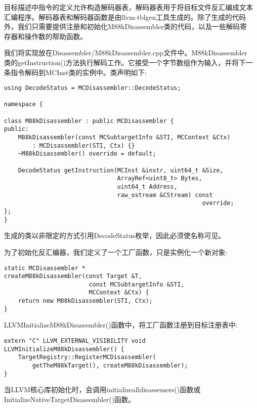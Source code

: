 目标描述中指令的定义允许构造解码器表，解码器表用于将目标文件反汇编成文本汇编程序。解码器表和解码器函数是由llvm-tblgen工具生成的。除了生成的代码外，我们只需要提供注册和初始化M88kDisassembler类的代码，以及一些解码寄存器和操作数的帮助函数。\par

我们将实现放在Disassembler/M88kDisassembler.cpp文件中。M88kDisassembler类的get\allowbreak Instruction()方法执行解码工作。它接受一个字节数组作为输入，并将下一条指令解码到MCInst类的实例中。类声明如下:\par

\begin{lstlisting}[caption={}]
using DecodeStatus = MCDisassembler::DecodeStatus;

namespace {
	
class M88kDisassembler : public MCDisassembler {
public:
	M88kDisassembler(const MCSubtargetInfo &STI, MCContext &Ctx)
		: MCDisassembler(STI, Ctx) {}
	~M88kDisassembler() override = default;
	
	DecodeStatus getInstruction(MCInst &instr, uint64_t &Size,
								ArrayRef<uint8_t> Bytes,
								uint64_t Address,
								raw_ostream &CStream) const
														override;
};
}
\end{lstlisting}

生成的类以非限定的方式引用DecodeStatus枚举，因此必须使名称可见。\par

为了初始化反汇编器，我们定义了一个工厂函数，只是实例化一个新对象:\par

\begin{lstlisting}[caption={}]
static MCDisassembler *
createM88kDisassembler(const Target &T,
						const MCSubtargetInfo &STI,
						MCContext &Ctx) {
	return new M88kDisassembler(STI, Ctx);
}
\end{lstlisting}

LLVMInitializeM88kDisassembler()函数中，将工厂函数注册到目标注册表中:\par

\begin{lstlisting}[caption={}]
extern "C" LLVM_EXTERNAL_VISIBILITY void
LLVMInitializeM88kDisassembler() {
	TargetRegistry::RegisterMCDisassembler(
		getTheM88kTarget(), createM88kDisassembler);
}
\end{lstlisting}

当LLVM核心库初始化时，会调用initializealldisassemers()函数或InitializeNativeTarget\allowbreak Disassembler()函数。\par

